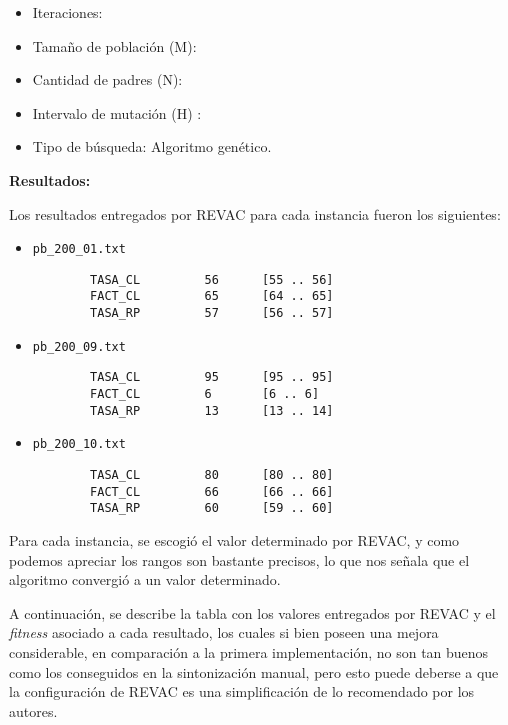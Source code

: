 \begin{itemize}
	\item Iteraciones: 
	\item Tamaño de población (M): 
	\item Cantidad de padres (N): 
	\item Intervalo de mutación (H) : 
	\item Tipo de búsqueda: Algoritmo genético.
\end{itemize}

\textbf{Resultados:}

Los resultados entregados por REVAC para cada instancia fueron los siguientes:

\begin{itemize}
	\item \texttt{pb\_200\_01.txt}\\

		\begin{verbatim}
		TASA_CL         56      [55 .. 56]
        FACT_CL         65      [64 .. 65]
        TASA_RP         57      [56 .. 57]
		\end{verbatim}
	\item \texttt{pb\_200\_09.txt}\\

		\begin{verbatim}
        TASA_CL         95      [95 .. 95]
        FACT_CL         6       [6 .. 6]
        TASA_RP         13      [13 .. 14]
		\end{verbatim}

	\item \texttt{pb\_200\_10.txt}\\

		\begin{verbatim}
        TASA_CL         80      [80 .. 80]
        FACT_CL         66      [66 .. 66]
        TASA_RP         60      [59 .. 60]
		\end{verbatim}

\end{itemize}

Para cada instancia, se escogió el valor determinado por REVAC,
y como podemos apreciar los rangos son bastante precisos, lo que nos señala
que el algoritmo convergió a un valor determinado.

A continuación, se describe la tabla con los valores entregados
por REVAC y el \emph{fitness} asociado a cada resultado, los cuales
si bien poseen una mejora considerable, en comparación a la primera implementación,
no son tan buenos como los conseguidos en la sintonización manual,
pero esto puede deberse a que la configuración de REVAC es una simplificación de
lo recomendado por los autores.


